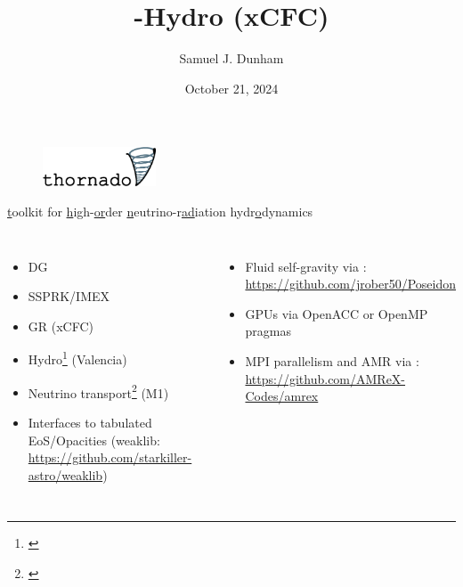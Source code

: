 \documentclass{beamer}
\title[SXS Group Meeting]{\thornado-Hydro (xCFC)}
\author{Samuel J. Dunham}
\date{October 21, 2024}
\begin{document}
\begin{frame}

  \maketitle

\end{frame}

\begin{frame}

  \begin{figure}[ht]
    \centering
    \includegraphics[width=0.3\textwidth]{fig.thornado_logo.png}
  \end{figure}

  \begin{center}

    \ul{t}oolkit for
    \ul{h}igh-\ul{or}der
    \ul{n}eutrino-r\ul{ad}iation hydr\ul{o}dynamics\\[1em]

  \end{center}

  \begin{columns}[c]


      \begin{itemize}
        \item
          DG
        \item
          SSPRK/IMEX
        \item
          GR (xCFC)
        \item
          Hydro\footnote{\citet{ebd2019,dem2020,pbe2021}}
          (Valencia)
        \item
          Neutrino transport\footnote{\citet{lec2021}} (M1)
        \item
          Interfaces to tabulated EoS/Opacities
          (weaklib: \url{https://github.com/starkiller-astro/weaklib})
      \end{itemize}


      \vspace{-6em}
      \begin{itemize}
        \item
          Fluid self-gravity via \poseidon:
          \url{https://github.com/jrober50/Poseidon}
        \item
          GPUs via OpenACC or OpenMP pragmas
        \item
          MPI parallelism and AMR via \amrex:
          \url{https://github.com/AMReX-Codes/amrex}
      \end{itemize}

  \end{columns}

\end{frame}
\end{document}

